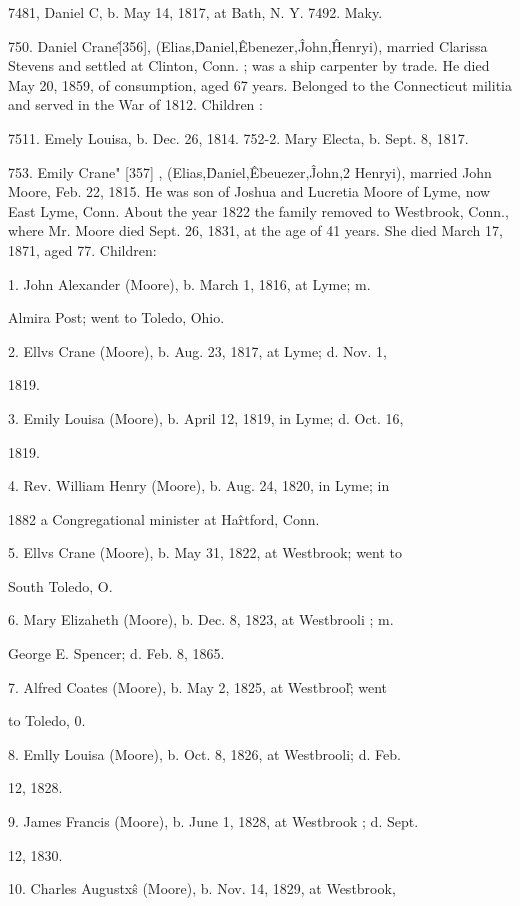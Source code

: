 7481, Daniel C, b. May 14, 1817, at Bath, N. Y. 
7492. Maky. 

750. Daniel Crane\^ [356], (Elias,\^ Daniel,\^ Ebenezer,\^ 
John,\^ Henryi), married Clarissa Stevens and settled at Clinton, 
Conn. ; was a ship carpenter by trade. He died May 20, 1859, 
of consumption, aged 67 years. Belonged to the Connecticut 
militia and served in the War of 1812. Children : 

7511. Emely Louisa, b. Dec. 26, 1814. 
752-2. Mary Electa, b. Sept. 8, 1817. 

753. Emily Crane" [357] , (Elias,\^ Daniel,\^ Ebeuezer,\^ John,2 
Henryi), married John Moore, Feb. 22, 1815. He was son of 
Joshua and Lucretia Moore of Lyme, now East Lyme, Conn. 
About the year 1822 the family removed to Westbrook, Conn., 
where Mr. Moore died Sept. 26, 1831, at the age of 41 years. 
She died March 17, 1871, aged 77. Children: 

1. John Alexander (Moore), b. March 1, 1816, at Lyme; m. 

Almira Post; went to Toledo, Ohio. 

2. Ellvs Crane (Moore), b. Aug. 23, 1817, at Lyme; d. Nov. 1, 

1819. 

3. Emily Louisa (Moore), b. April 12, 1819, in Lyme; d. Oct. 16, 

1819. 

4. Rev. William Henry (Moore), b. Aug. 24, 1820, in Lyme; in 

1882 a Congregational minister at Ha\^rtford, Conn. 

5. Ellvs Crane (Moore), b. May 31, 1822, at Westbrook; went to 

South Toledo, O. 

6. Mary Elizaheth (Moore), b. Dec. 8, 1823, at Westbrooli ; m. 

George E. Spencer; d. Feb. 8, 1865. 

7. Alfred Coates (Moore), b. May 2, 1825, at Westbrool\^; went 

to Toledo, 0. 

8. Emlly Louisa (Moore), b. Oct. 8, 1826, at Westbrooli; d. Feb. 

12, 1828. 

9. James Francis (Moore), b. June 1, 1828, at Westbrook ; d. Sept. 

12, 1830. 




10. Charles Augustx\^s (Moore), b. Nov. 14, 1829, at Westbrook, 

